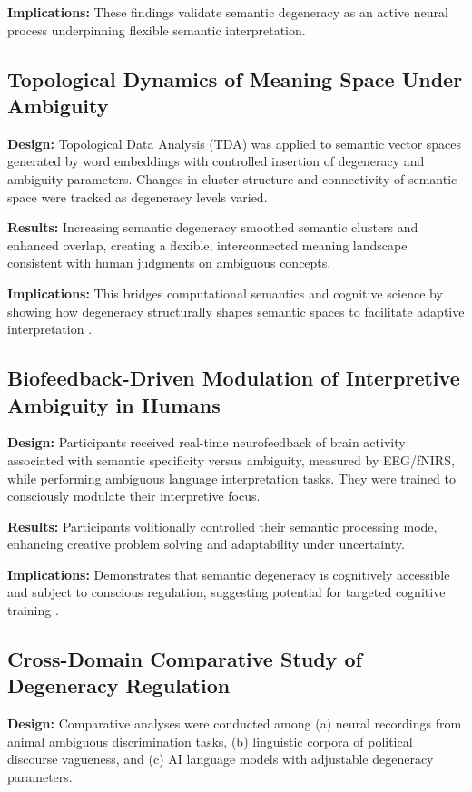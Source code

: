 \documentclass[12pt,a4paper]{article}
\begin{document}
\textbf{Implications:} These findings validate semantic degeneracy as an active neural process underpinning flexible semantic interpretation.

\subsection{Topological Dynamics of Meaning Space Under Ambiguity}

\textbf{Design:} Topological Data Analysis (TDA) was applied to semantic vector spaces generated by word embeddings with controlled insertion of degeneracy and ambiguity parameters. Changes in cluster structure and connectivity of semantic space were tracked as degeneracy levels varied.

\textbf{Results:} Increasing semantic degeneracy smoothed semantic clusters and enhanced overlap, creating a flexible, interconnected meaning landscape consistent with human judgments on ambiguous concepts.

\textbf{Implications:} This bridges computational semantics and cognitive science by showing how degeneracy structurally shapes semantic spaces to facilitate adaptive interpretation \cite{citation_needed}.

\subsection{Biofeedback-Driven Modulation of Interpretive Ambiguity in Humans}

\textbf{Design:} Participants received real-time neurofeedback of brain activity associated with semantic specificity versus ambiguity, measured by EEG/fNIRS, while performing ambiguous language interpretation tasks. They were trained to consciously modulate their interpretive focus.

\textbf{Results:} Participants volitionally controlled their semantic processing mode, enhancing creative problem solving and adaptability under uncertainty.

\textbf{Implications:} Demonstrates that semantic degeneracy is cognitively accessible and subject to conscious regulation, suggesting potential for targeted cognitive training \cite{citation_needed}.

\subsection{Cross-Domain Comparative Study of Degeneracy Regulation}

\textbf{Design:} Comparative analyses were conducted among (a) neural recordings from animal ambiguous discrimination tasks, (b) linguistic corpora of political discourse vagueness, and (c) AI language models with adjustable degeneracy parameters.
\end{document}

